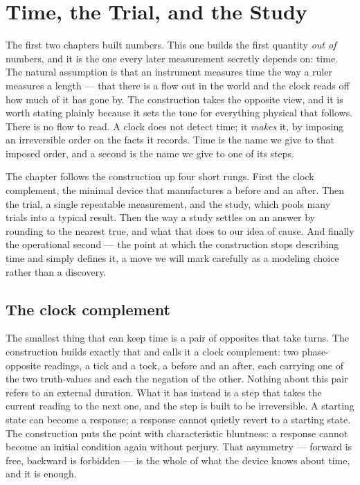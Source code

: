 \chapter{Time, the Trial, and the Study}
\label{chap:time-trial-study}

The first two chapters built numbers. This one builds the first quantity \emph{out of} numbers, and it
is the one every later measurement secretly depends on: time. The natural assumption is that an
instrument measures time the way a ruler measures a length --- that there is a flow out in the world
and the clock reads off how much of it has gone by. The construction takes the opposite view, and it
is worth stating plainly because it sets the tone for everything physical that follows. There is no
flow to read. A clock does not detect time; it \emph{makes} it, by imposing an irreversible order on
the facts it records. Time is the name we give to that imposed order, and a second is the name we give
to one of its steps.

The chapter follows the construction up four short rungs. First the clock complement, the minimal
device that manufactures a before and an after. Then the trial, a single repeatable measurement, and
the study, which pools many trials into a typical result. Then the way a study settles on an answer by
rounding to the nearest true, and what that does to our idea of cause. And finally the operational
second --- the point at which the construction stops describing time and simply defines it, a move we
will mark carefully as a modeling choice rather than a discovery.

\section{The clock complement}
\label{se:the-clock-complement}

The smallest thing that can keep time is a pair of opposites that take turns. The construction builds
exactly that and calls it a clock complement: two phase-opposite readings, a tick and a tock, a
before and an after, each carrying one of the two truth-values and each the negation of the other.
Nothing about this pair refers to an external duration. What it has instead is a step that takes the
current reading to the next one, and the step is built to be irreversible. A starting state can become
a response; a response cannot quietly revert to a starting state. The construction puts the point with
characteristic bluntness: a response cannot become an initial condition again without perjury. That
asymmetry --- forward is free, backward is forbidden --- is the whole of what the device knows about
time, and it is enough.

